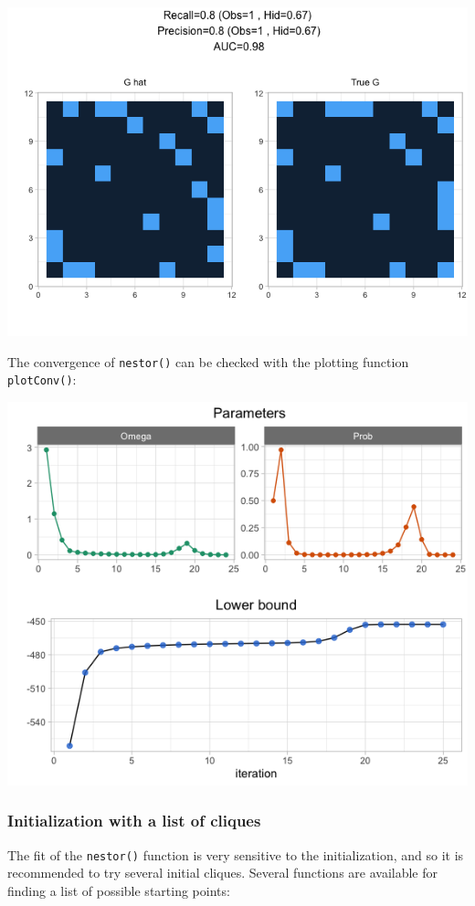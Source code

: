 \begin{center}\includegraphics[width=0.65\linewidth]{nestorArticle/man/figures/README-unnamed-chunk-9-1} \end{center}

The convergence of \texttt{nestor()} can be checked with the plotting
function \texttt{plotConv()}:

\begin{Shaded}
\begin{Highlighting}[]
\NormalTok{(}
\end{Highlighting}
\end{Shaded}

\begin{center}\includegraphics[width=0.6\linewidth]{nestorArticle/man/figures/README-unnamed-chunk-10-1} \end{center}

\subsubsection{Initialization with a list of
cliques}\label{initialization-with-a-list-of-cliques}

The fit of the \texttt{nestor()} function is very sensitive to the
initialization, and so it is recommended to try several initial cliques.
Several functions are available for finding a list of possible starting
points:

